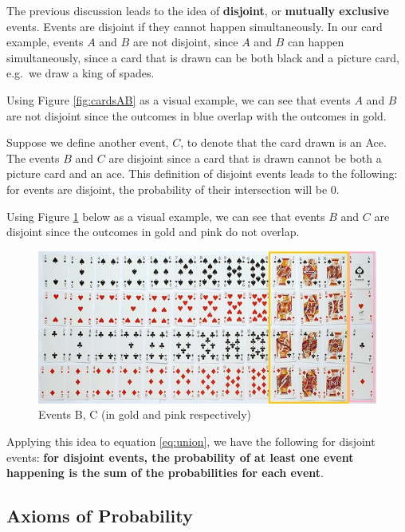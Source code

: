 \documentclass[
]{book}
\begin{document}
The previous discussion leads to the idea of \textbf{disjoint}, or \textbf{mutually exclusive} events. Events are disjoint if they cannot happen simultaneously. In our card example, events \(A\) and \(B\) are not disjoint, since \(A\) and \(B\) can happen simultaneously, since a card that is drawn can be both black and a picture card, e.g.~we draw a king of spades.

Using Figure \ref{fig:cardsAB} as a visual example, we can see that events \(A\) and \(B\) are not disjoint since the outcomes in blue overlap with the outcomes in gold.

Suppose we define another event, \(C\), to denote that the card drawn is an Ace. The events \(B\) and \(C\) are disjoint since a card that is drawn cannot be both a picture card and an ace. This definition of disjoint events leads to the following: for events are disjoint, the probability of their intersection will be 0.

Using Figure \ref{fig:cardsBC} below as a visual example, we can see that events \(B\) and \(C\) are disjoint since the outcomes in gold and pink do not overlap.

\begin{figure}
\centering
\includegraphics{images/02-cardsBC.jpg}
\caption{\label{fig:cardsBC}Events B, C (in gold and pink respectively)}
\end{figure}

Applying this idea to equation \eqref{eq:union}, we have the following for disjoint events: \textbf{for disjoint events, the probability of at least one event happening is the sum of the probabilities for each event}.

\hypertarget{axioms-of-probability}{%
\subsection{Axioms of Probability}\label{axioms-of-probability}}
\end{document}

